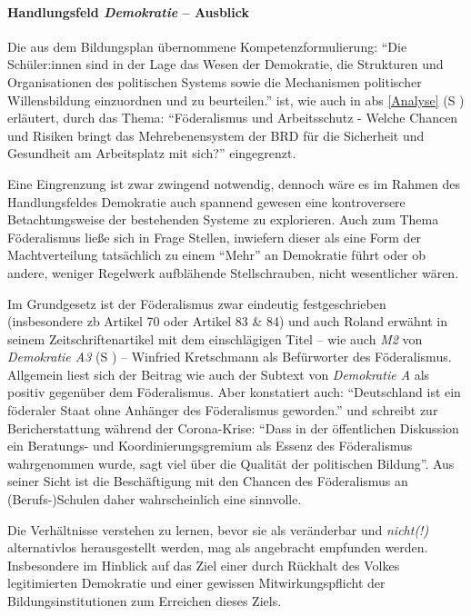 \paragraph{Handlungsfeld \emph{Demokratie} -- Ausblick}%
Die aus dem Bildungsplan übernommene Kompetenzformulierung: \enquote{Die Schüler:innen sind in der Lage das Wesen der Demokratie, die Strukturen und Organisationen des politischen Systems sowie die Mechanismen politischer Willensbildung einzuordnen und zu beurteilen.}
ist, wie auch in \gls{abs} \ref{Analyse} (\gls{S} \pageref{Analyse}) erläutert, durch das Thema: \enquote{Föderalismus und Arbeitsschutz - Welche Chancen und Risiken bringt das Mehrebenensystem der BRD für die Sicherheit und Gesundheit am Arbeitsplatz mit sich?} eingegrenzt. 

Eine Eingrenzung ist zwar zwingend notwendig, dennoch wäre es im Rahmen des Handlungsfeldes Demokratie auch spannend gewesen eine kontroversere Betachtungsweise der bestehenden Systeme zu explorieren. Auch zum Thema Föderalismus ließe sich in Frage Stellen, inwiefern dieser als eine Form der Machtverteilung tatsächlich zu einem \enquote{Mehr} an Demokratie führt oder ob andere, weniger Regelwerk aufblähende Stellschrauben, nicht wesentlicher wären. 

Im Grundgesetz ist der Föderalismus zwar eindeutig festgeschrieben (insbesondere \gls{zb} Artikel 70 oder Artikel 83 \& 84) und auch Roland \textcite[397]{Sturm.2021} erwähnt in seinem Zeitschriftenartikel mit dem einschlägigen Titel  -- wie auch \emph{M2} von \emph{Demokratie A3} (\gls{S} \pageref{DEMOKRATIE-A3}) -- Winfried Kretschmann als Befürworter des Föderalismus. Allgemein liest sich der Beitrag wie auch der Subtext von \emph{Demokratie A} als positiv gegenüber dem Föderalismus. Aber \citeauthor{Sturm.2021} konstatiert auch: \enquote{Deutschland ist ein föderaler Staat ohne Anhänger des Föderalismus geworden.} \autocite[397]{Sturm.2021} und schreibt zur Bericherstattung während der Corona-Krise: \enquote{Dass in der öffentlichen Diskussion ein Beratungs- und Koordinierungsgremium als Essenz des Föderalismus wahrgenommen wurde, sagt viel über die Qualität der politischen Bildung}. Aus seiner Sicht ist die Beschäftigung mit den Chancen des Föderalismus an (Berufs-)Schulen daher wahrscheinlich eine sinnvolle. 

Die Verhältnisse verstehen zu lernen, bevor sie als veränderbar und \emph{nicht(!)} alternativlos herausgestellt werden, mag als angebracht empfunden werden. Insbesondere im Hinblick auf das Ziel einer durch Rückhalt des Volkes legitimierten Demokratie und einer gewissen Mitwirkungspflicht der Bildungsinstitutionen zum Erreichen dieses Ziels.


